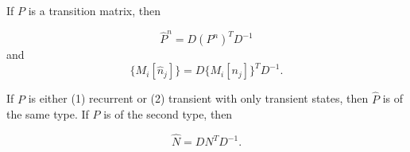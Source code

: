If $P$ is a transition matrix, then

$$\hat{P}^n = D(P^n)^T D^{-1}$$ and $$\{M_i[\hat{n}_j]\} = D\{M_i[n_j]\}^T D^{-1}.$$

If $P$ is either (1) recurrent or (2) transient with only transient states, then $\hat{P}$ is of the same type. If $P$ is of the second type, then

$$\hat{N} = DN^T D^{-1}.$$
